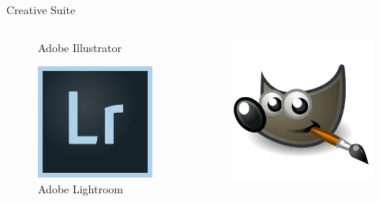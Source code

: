 \documentclass[10pt]{beamer}
\begin{document}
\begin{frame}{Creative Suite}
\begin{columns}
\begin{column}{0.5\textwidth}
\begin{figure}
                    \caption{Adobe Illustrator}
                \end{figure}
                \begin{figure}
                    \includegraphics[height=0.12\paperheight]{images/lightroom}
                    \caption{Adobe Lightroom}
                \end{figure}
            \end{column}
            \vrule{}
            \begin{column}{0.5\textwidth}
                \begin{figure}
                    \includegraphics[height=0.12\paperheight]{images/gimp}

\end{figure}
\end{column}
\end{columns}
\end{frame}
\end{document}

